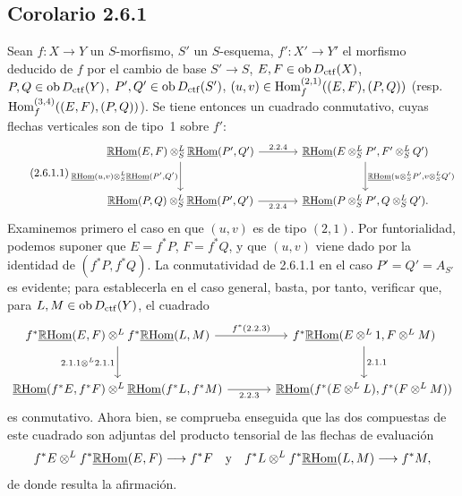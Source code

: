 \subsection*{Corolario 2.6.1}
Sean $f:X\to Y$ un $S$-morfismo, $S'$ un $S$-esquema, $f':X'\to Y'$ el morfismo deducido de $f$ por el cambio de base $S'\to S$, $E,F\in\operatorname{ob} D_{\mathrm{ctf}}(X)$, $P,Q\in\operatorname{ob} D_{\mathrm{ctf}}(Y)$, $P',Q'\in\operatorname{ob} D_{\mathrm{ctf}}(S')$, $(u,v)\in\operatorname{Hom}_f^{(2,1)}((E,F),(P,Q))$ (resp. $\operatorname{Hom}_f^{(3,4)}((E,F),(P,Q))$). Se tiene entonces un cuadrado conmutativo, cuyas flechas verticales son de tipo~1 sobre $f'$:
\begin{equation}\tag{2.6.1.1}
\begin{tikzcd}[column sep=large,row sep=large]
\uRHom(E,F)\otimes^L_S\uRHom(P',Q') \arrow[r,"2.2.4"] \arrow[d,"{\uRHom(u,v)\otimes^L_S\uRHom(P',Q')}"'] & \uRHom(E\otimes^L_SP',F'\otimes^L_SQ') \arrow[d,"{\uRHom(u\otimes^L_SP',v\otimes^L_SQ')}"]\\
\uRHom(P,Q)\otimes^L_S\uRHom(P',Q') \arrow[r,"2.2.4"'] & \uRHom(P\otimes^L_SP',Q\otimes^L_SQ').
\end{tikzcd}
\end{equation}
Examinemos primero el caso en que $(u,v)$ es de tipo $(2,1)$. Por funtorialidad, podemos suponer que $E=f^{*}P$, $F=f^{*}Q$, y que $(u,v)$ viene dado por la identidad de $(f^{*}P,f^{*}Q)$. La conmutatividad de 2.6.1.1 en el caso $P'=Q'=A_{S'}$ es evidente; para establecerla en el caso general, basta, por tanto, verificar que, para $L,M\in\operatorname{ob} D_{\mathrm{ctf}}(Y)$, el cuadrado
\[
\begin{tikzcd}[column sep=large,row sep=large]
f^{*}\uRHom(E,F)\otimes^L f^{*}\uRHom(L,M) \arrow[r,"{f^*(2.2.3)}"] \arrow[d,"{2.1.1\otimes^L 2.1.1}"'] & f^{*}\uRHom(E\otimes^L1,F\otimes^LM) \arrow[d,"2.1.1"]\\
\uRHom(f^{*}E,f^{*}F)\otimes^L\uRHom(f^{*}L,f^{*}M) \arrow[r,"2.2.3"'] & \uRHom(f^{*}(E\otimes^LL),f^{*}(F\otimes^LM))
\end{tikzcd}
\]
es conmutativo. Ahora bien, se comprueba enseguida que las dos compuestas de este cuadrado son adjuntas del producto tensorial de las flechas de evaluación
\[
f^{*}E\otimes^L f^{*}\underline{\mathbb{R}\mathrm{Hom}}(E,F)\longrightarrow f^{*}F
\quad\text{y}\quad
f^{*}L\otimes^L f^{*}\underline{\mathbb{R}\mathrm{Hom}}(L,M)\longrightarrow f^{*}M,
\]
de donde resulta la afirmación.

